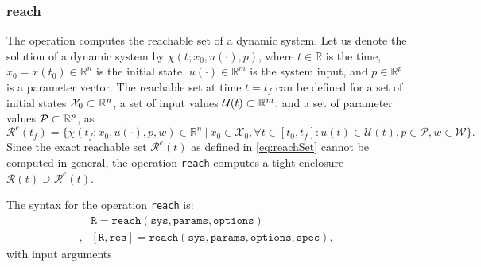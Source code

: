 \subsubsection{reach} \label{sec:reach}

The operation  computes the reachable set of a dynamic system. Let us denote the solution of a dynamic system by $\chi(t;x_0,u(\cdot),p)$, where $t\in\mathbb{R}$ is the time, $x_0 = x(t_0) \in \mathbb{R}^n$ is the initial state, $u(\cdot) \in \mathbb{R}^m$ is the system input, and $p\in \mathbb{R}^p$ is a parameter vector. The reachable set at time $t=t_f$ can be defined for a set of initial states $\mathcal{X}_0 \subset \mathbb{R}^n$, a set of input values $\mathcal{U}(t) \subset \mathbb{R}^m$, and a set of parameter values $\mathcal{P} \subset \mathbb{R}^p$, as
\begin{equation}
  \mathcal{R}^e(t_f) = \Big\{ \chi(t_f;x_0,u(\cdot),p,w) \in \mathbb{R}^n ~\big|~ x_0 \in \mathcal{X}_0, \forall t \in [t_0,t_f]: u(t)\in\mathcal{U}(t), p \in \mathcal{P}, w \in \mathcal{W} \Big\}.
  \label{eq:reachSet}
\end{equation}
Since the exact reachable set $\mathcal{R}^e(t)$ as defined in \eqref{eq:reachSet} cannot be computed in general, the operation \texttt{reach} computes a tight enclosure $\mathcal{R}(t) \supseteq \mathcal{R}^e(t)$.

The syntax for the operation \texttt{reach} is:
\begin{equation*}
\begin{split}
	& \texttt{R} = \texttt{reach}(\texttt{sys},\texttt{params},\texttt{options}) \\,
	& [\texttt{R},\texttt{res}] = \texttt{reach}(\texttt{sys},\texttt{params},\texttt{options},\texttt{spec}),
\end{split}
\end{equation*}
with input arguments

